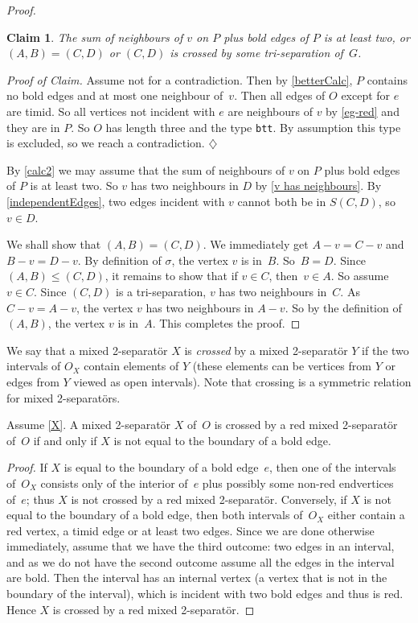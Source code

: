 \documentclass{aic}
\newenvironment{cproof}{\noindent\textit{Proof of Claim.}}{\phantom{!}\!\hfill$\diamondsuit$}
\theoremstyle{plain}
\newtheorem{sublem}{Claim}[thm]
\theoremstyle{definition}
\theoremstyle{plain}
\theoremstyle{plain}
\renewcommand{\leq}{\leqslant}
\newcommand{\ty}[1]{{\tt#1}}
\begin{document}
\begin{proof}
\begin{sublem}\label{calc2}
The sum of neighbours of $v$ on $P$ plus bold edges of $P$ is at least two, or $(A,B)=(C,D)$ or $(C,D)$ is crossed by some tri-separation of~$G$.
\end{sublem}

\begin{cproof}
Assume not for a contradiction. Then by \autoref{betterCalc}, $P$ contains no bold edges and at most one neighbour of~$v$.
Then all edges of $O$ except for $e$ are timid. So all vertices not incident with $e$ are neighbours of $v$ by \autoref{eg-red} and they are in $P$. So $O$ has length three and the type \ty{btt}. 
By assumption this type is excluded, so we reach a contradiction.    
\end{cproof}\medskip

By \autoref{calc2} we may assume that the sum of neighbours of $v$ on $P$ plus bold edges of $P$ is at least two. 
So $v$ has two neighbours in $D$ by \autoref{v has neighbours}. By \autoref{independentEdges}, two edges incident with $v$ cannot both be in $S(C,D)$, so~$v\in D$. 

We shall show that $(A,B)= (C,D)$. 
We immediately get $A-v=C-v$ and $B-v=D-v$.
By definition of $\sigma$, the vertex $v$ is in~$B$. 
So~$B=D$. 
Since $(A,B)\leq (C,D)$, it remains to show that if $v\in C$, then~$v\in A$.
So assume~$v\in C$. 
Since $(C,D)$ is a tri-separation, $v$ has two neighbours in~$C$. 
As $C-v=A-v$, the vertex $v$ has two neighbours in $A-v$. 
So by the definition of $(A,B)$, the vertex $v$ is in~$A$. This completes the proof.
\end{proof}

We say that a mixed 2-separat{\"o}r $X$ is \emph{crossed} by a mixed 2-separat{\"o}r $Y$ if the two intervals of $O_X$ contain elements of $Y$ (these elements can be vertices from $Y$ or edges from $Y$ viewed as open intervals). 
Note that crossing is a symmetric relation for mixed 2-separat{\"o}rs.

\begin{lem}\label{red_angry}
Assume \autoref{X}.
A mixed 2-separat{\"o}r $X$ of~$O$ is crossed by a red mixed 2-separat{\"o}r of~$O$ if and only if $X$ is not equal to the boundary of a bold edge.    
\end{lem}
\begin{proof}
If $X$ is equal to the boundary of a bold edge~$e$, then one of the intervals of~$O_X$ consists only of the interior of~$e$ plus possibly some non-red endvertices of~$e$; thus $X$ is not crossed by a red mixed 2-separat{\"o}r. 
Conversely, if $X$ is not equal to the boundary of a bold edge, then both intervals of~$O_X$ either contain a red vertex, a timid edge or at least two edges.
Since we are done otherwise immediately, assume that we have the third outcome: two edges in an interval, and as we do not have the second outcome assume all the edges in the interval are bold. 
Then the interval has an internal vertex (a vertex that is not in the boundary of the interval), which is incident with two bold edges and thus is red. 
Hence $X$ is crossed by a red mixed 2-separat{\"o}r.
\end{proof}
\end{document}
